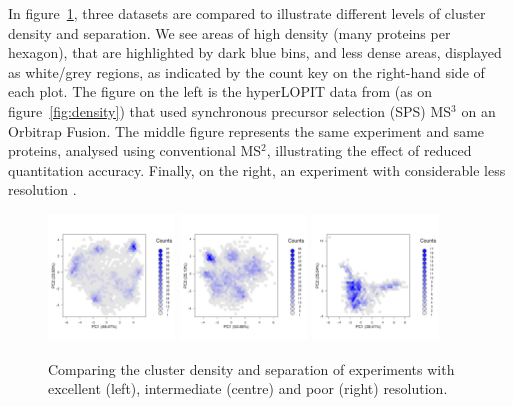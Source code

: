 \documentclass[12pt]{article}\usepackage[]{graphicx}\usepackage[]{color}
\begin{document}
In figure~\ref{fig:hexbin1}, three datasets are compared to illustrate
different levels of cluster density and separation. We see areas of
high density (many proteins per hexagon), that are highlighted by dark
blue bins, and less dense areas, displayed as white/grey regions, as
indicated by the count key on the right-hand side of each plot. The
figure on the left is the hyperLOPIT data from
\citet{Christoforou:2016} (as on figure~\ref{fig:density}) that used
synchronous precursor selection (SPS) MS$^3$ on an Orbitrap
Fusion. The middle figure represents the same experiment and same
proteins, analysed using conventional MS$^2$, illustrating the effect
of reduced quantitation accuracy. Finally, on the right, an experiment
with considerable less resolution \citep{Hall:2009}.

\begin{figure}[ht]
  \centering
  \includegraphics[width = 0.3\textwidth]{./figure/hexbin-1.pdf}
  \includegraphics[width = 0.3\textwidth]{./figure/hexbin-2.pdf}
  \includegraphics[width = 0.3\textwidth]{./figure/hexbin-3.pdf}
  \caption{Comparing the cluster density and separation of experiments
    with excellent (left), intermediate (centre) and poor (right)
    resolution.}
  \label{fig:hexbin1}
\end{figure}
\end{document}
